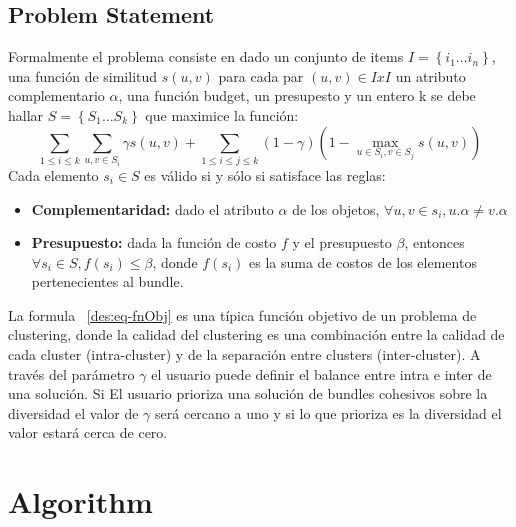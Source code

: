 \subsection{Problem Statement}
Formalmente el problema consiste en dado un conjunto de items $ I=\left\{i_1 \ldots i_n\right\} $, una función de similitud $ s(u,v) $ para cada par $ (u,v) \in IxI $ un atributo complementario $\alpha$, una función budget, un presupesto y un entero k se debe hallar $ S=\left\{S_1 \ldots S_k\right\} $ que maximice la función:
\begin{equation} \label{des:eq-fnObj}
\sum_{1 \leq i \leq k}{\sum_{u,v \in S_i}{\gamma s(u,v)}} + \sum_{1 \leq i \leq j \leq k}{(1-\gamma) (1-\max_{u \in S_i, v \in S_j}{s(u,v)})}
\end{equation}
Cada elemento $s_i \in S$ es válido si y sólo si satisface las reglas:
\begin{itemize}
	\item \textbf{Complementaridad:} dado el atributo $\alpha$ de los objetos, $\forall u,v \in s_i, u.\alpha \neq v.\alpha$
	\item \textbf{Presupuesto:} dada la función de costo $f$ y el presupuesto $\beta$, entonces $\forall s_i \in S, f(s_i) \leq \beta$, donde $f(s_i)$ es la suma de costos de los elementos pertenecientes al bundle.
\end{itemize}
La formula ~\ref{des:eq-fnObj} es una típica función objetivo de un problema de clustering, donde la calidad del clustering es una combinación entre la calidad de cada cluster (intra-cluster) y de la separación entre clusters (inter-cluster). A través del parámetro $\gamma$ el usuario puede definir el balance entre intra e inter de una solución. Si El usuario prioriza una solución de bundles cohesivos sobre la diversidad el  valor de $\gamma$ será cercano a uno y si lo que prioriza es la diversidad el valor estará cerca de cero.\\
\section{Algorithm}
